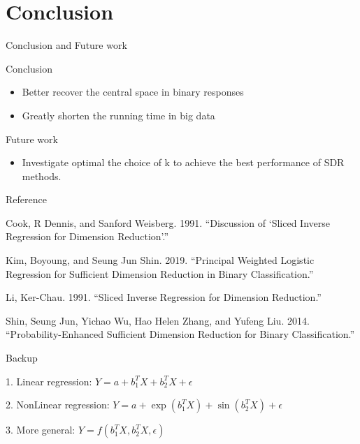 \documentclass[ignorenonframetext,]{beamer}
\providecommand{\tightlist}{%
  \setlength{\itemsep}{0pt}\setlength{\parskip}{0pt}}
\begin{document}
\section{Conclusion}\label{conclusion}

\begin{frame}{Conclusion and Future work}

\begin{block}{Conclusion}

\begin{itemize}
\tightlist
\item
  Better recover the central space in binary responses
\item
  Greatly shorten the running time in big data
\end{itemize}

\end{block}

\begin{block}{Future work}

\begin{itemize}
\tightlist
\item
  Investigate optimal the choice of k to achieve the best performance of
  SDR methods.
\end{itemize}

\end{block}

\end{frame}

\begin{frame}{Reference}

\hypertarget{refs}{}
\hypertarget{ref-ref7}{}
Cook, R Dennis, and Sanford Weisberg. 1991. ``Discussion of `Sliced
Inverse Regression for Dimension Reduction'.''

\hypertarget{ref-ref9}{}
Kim, Boyoung, and Seung Jun Shin. 2019. ``Principal Weighted Logistic
Regression for Sufficient Dimension Reduction in Binary
Classification.''

\hypertarget{ref-ref6}{}
Li, Ker-Chau. 1991. ``Sliced Inverse Regression for Dimension
Reduction.''

\hypertarget{ref-ref8}{}
Shin, Seung Jun, Yichao Wu, Hao Helen Zhang, and Yufeng Liu. 2014.
``Probability-Enhanced Sufficient Dimension Reduction for Binary
Classification.''

\end{frame}

\begin{frame}{Backup}

\begin{examples}

1. Linear regression: $Y = a + b_1^TX + b_2^TX + \epsilon$

2. NonLinear regression: $Y = a + \exp(b_1^TX) + \sin(b_2^TX) + \epsilon$

3. More general: $Y = f(b_1^TX, b_2^TX, \epsilon)$
\end{examples}

\end{frame}
\end{document}
